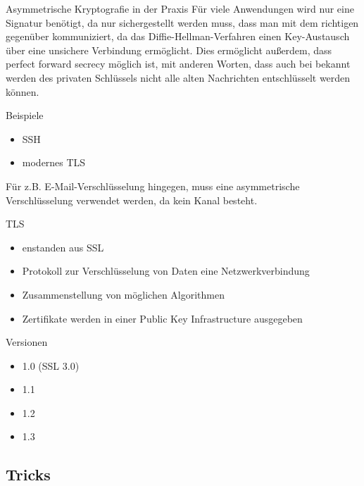\documentclass[10pt]{beamer}
\begin{document}
	\begin{frame}{Asymmetrische Kryptografie in der Praxis}
		Für viele Anwendungen wird nur eine Signatur benötigt, da nur sichergestellt werden muss, dass man mit dem richtigen gegenüber kommuniziert, da das Diffie-Hellman-Verfahren einen Key-Austausch über eine unsichere Verbindung ermöglicht. Dies ermöglicht außerdem, dass perfect forward secrecy möglich ist, mit anderen Worten, dass auch bei bekannt werden des privaten Schlüssels nicht alle alten Nachrichten entschlüsselt werden können.
		
		\begin{alertblock}{Beispiele}
			\begin{itemize}
				\item SSH
				\item modernes TLS
			\end{itemize}
		\end{alertblock}
		
		Für z.B. E-Mail-Verschlüsselung hingegen, muss eine asymmetrische Verschlüsselung verwendet werden, da kein Kanal besteht.
	\end{frame}

	\begin{frame}{TLS}
		\begin{itemize}
			\item enstanden aus SSL
			\item Protokoll zur Verschlüsselung von Daten eine Netzwerkverbindung
			\item Zusammenstellung von möglichen Algorithmen
			\item Zertifikate werden in einer Public Key Infrastructure ausgegeben
		\end{itemize}
		\begin{alertblock}{Versionen}
			\begin{itemize}
				\color{red}
				\item 1.0 (SSL 3.0)
				\item 1.1
				\color{darkgreen}
				\item 1.2
				\item 1.3
			\end{itemize}
		\end{alertblock}
	\end{frame}
	
	
	
	\subsection{Tricks}
	
\end{document}
